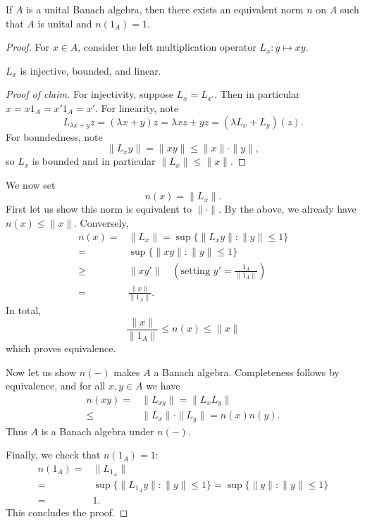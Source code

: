 \documentclass[12pt]{article}
\begin{document}
\begin{lemma}
\label{lemma_equivalent_unital_norm}
	If $A$ is a unital Banach algebra, then there exists an equivalent norm $n$ on $A$ such that $A$ is unital and $n(1_A) = 1$. 	
\end{lemma}
\begin{proof}
	For $x\in A$, consider the left multiplication operator $L_x: y\mapsto xy$. 
	\begin{claim}
		$L_x$ is injective, bounded, and linear.
	\end{claim}
	\begin{proof}[Proof of claim] 
		For injectivity, suppose $L_x = L_{x'}$. Then in particular $x = x1_A = x'1_A = x'$. For linearity, note 
		\begin{equation*}
			L_{\lambda x + y}z = (\lambda x + y)z  = \lambda xz + yz = (\lambda L_x + L_y)(z).
		\end{equation*}
		For boundedness, note 
		\begin{equation*}
			\|L_x y\| = \|xy\| \leq \|x\| \cdot \|y\|,
		\end{equation*}
		so $L_x$ is bounded and in particular $\|L_x\| \leq \|x\|$.
	\end{proof}

	We now set 
	\begin{equation*}
		n(x) = \|L_x\|.
	\end{equation*}
	First let us show this norm is equivalent to $\|\cdot\|$. By the above, we already have $n(x) \leq \|x\|$. Conversely,
	\begin{align*}
		n(x)  
		=& \|L_x\| = \sup\{ \|L_xy\| : \|y\|\leq 1 \} \\
		=& \sup\{ \|xy\| : \|y\|\leq 1 \} \\
		\geq&  \|xy'\| \quad (\text{setting } y'=\frac{1_A}{\|1_A\|}) \\
		=& \frac{\|x\|}{\|1_A\|}.
	\end{align*}
	In total, 
	\begin{equation*}
		\frac{\|x\|}{\|1_A\|} \leq n(x) \leq \|x\|
	\end{equation*}
	which proves equivalence.

	Now let us show $n(-)$ makes $A$ a Banach algebra. Completeness follows by equivalence, and for all $x,y\in A$ we have 
	\begin{align*}
		n(xy) 
		=& \|L_{xy}\| = \|L_xL_y\| \\
		\leq& \|L_x\| \cdot \|L_y\| = n(x)n(y).
	\end{align*}
	 Thus $A$ is a Banach algebra under $n(-)$. 

	Finally, we check that $n(1_A)=1$:
	\begin{align*}
		n(1_A)
		=& \|L_{1_A}\| \\
		=& \sup\{ \|L_{1_A}y\| : \|y\|\leq 1 \} = \sup\{ \|y\| : \|y\|\leq 1 \} \\
		=& 1.
	\end{align*}
	This concludes the proof.
\end{proof}
\end{document}
